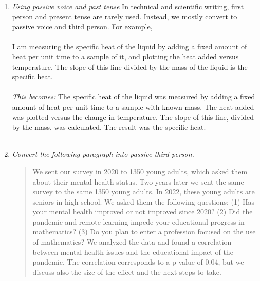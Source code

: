 \documentclass{article}
\begin{document}
\begin{enumerate}
\item \textit{Using passive voice and past tense} In technical and scientific writing, first person and present tense are rarely used.  Instead, we mostly convert to passive voice and third person.  For example, \\ \\
I am measuring the specific heat of the liquid by adding a fixed amount of heat per unit time to a sample of it, and plotting the heat added versus temperature.  The slope of this line divided by the mass of the liquid is the specific heat. \\ \\
\textit{This becomes:} The specific heat of the liquid was measured by adding a fixed amount of heat per unit time to a sample with known mass.  The heat added was plotted versus the change in temperature.  The slope of this line, divided by the mass, was calculated.  The result was the specific heat. \\ \\
\item \textit{Convert the following paragraph into passive third person.}
\begin{quote}
We sent our survey in 2020 to 1350 young adults, which asked them about their mental health status.  Two years later we sent the same survey to the same 1350 young adults.  In 2022, these young adults are seniors in high school.  We asked them the following questions: (1) Has your mental health improved or not improved since 2020? (2) Did the pandemic and remote learning impede your educational progress in mathematics? (3) Do you plan to enter a profession focused on the use of mathematics?  We analyzed the data and found a correlation between mental health issues and the educational impact of the pandemic.  The correlation corresponds to a p-value of 0.04, but we discuss also the size of the effect and the next steps to take.
\end{quote}
\end{enumerate}
\end{document}
